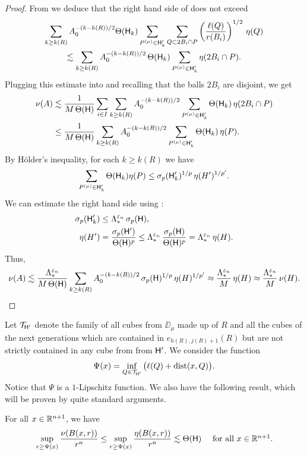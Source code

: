 \begin{proof}
From  we deduce that the right hand side of 
does not exceed
\begin{multline*}
\sum_{k\geq k(R)}A_0^{-(k-k(R))/2} \Theta({\mathsf{H}}_k)\sum_{P^{(\mu)}\in {\mathsf{H}}'_k} 
\sum_{Q\subset 2B_i\cap P} \left(\frac{\ell(Q)}{r(B_i)}\right)^{1/2}\,\eta(Q)\\
\lesssim \sum_{k\geq k(R)}A_0^{-(k-k(R))/2} \,\Theta({\mathsf{H}}_k)\sum_{P^{(\mu)}\in {\mathsf{H}}'_k} 
\eta(2B_i\cap P).
\end{multline*}
Plugging this estimate into  and recalling that the balls $2B_i$ are disjoint, we get
\begin{align*}
\nu(A) & \lesssim \frac{1}{M\,\Theta({\mathsf{H}})} \sum_{i\in I}
\sum_{k\geq k(R)}A_0^{-(k-k(R))/2} \sum_{P^{(\mu)}\in {\mathsf{H}}'_k} \Theta({\mathsf{H}}_k)\, \eta(2B_i\cap P)\\
& \leq
\frac{1}{M\,\Theta({\mathsf{H}})}
\sum_{k\geq k(R)}A_0^{-(k-k(R))/2} \sum_{P^{(\mu)}\in {\mathsf{H}}'_k} \Theta({\mathsf{H}}_k) \,\eta(P).
\end{align*}
By H\"older's inequality, for each $k\geq k(R)$ we have
$$\sum_{P^{(\mu)}\in {\mathsf{H}}'_k} \Theta({\mathsf{H}}_k) \eta(P) \leq \sigma_p({\mathsf{H}}'_k)^{1/p}\,\eta(H')^{1/p'}.
$$
We can estimate the right hand side using :
\begin{align*}
\sigma_p({\mathsf{H}}'_k)&\le \Lambda_*^{{\varepsilon}_n}\,\sigma_p({\mathsf{H}}),\\ \eta(H')&=\frac{\sigma_p({\mathsf{H}}')}{\Theta({\mathsf{H}})^p} \le \Lambda_*^{{\varepsilon}_n}\,\frac{\sigma_p({\mathsf{H}})}{\Theta({\mathsf{H}})^p} = \Lambda_*^{{\varepsilon}_n}\,\eta(H).
\end{align*}
Thus,
$$\nu(A) \lesssim \frac{\Lambda_*^{{\varepsilon}_n}}{M\,\Theta({\mathsf{H}})} \sum_{k\geq k(R)}A_0^{-(k-k(R))/2} \,\sigma_p({\mathsf{H}})^{1/p}\,\eta(H)^{1/p'}
\approx
\frac{\Lambda_*^{{\varepsilon}_n}}{M}\,\eta(H)\approx \frac{\Lambda_*^{{\varepsilon}_n}}{M}\,\nu(H).$$
\end{proof}
\vv


Let ${\mathcal T}_{{\mathsf{H}}'}$ denote the family of all cubes from $\DD_\mu$ 
 made up of $R$ and all the cubes of the next generations which are contained in $e_{h(R),j(R)+1}(R)$ but are not 
strictly contained in any cube from from ${\mathsf{H}}'$. We consider the function
\begin{equation}\label{eqdefPsi1}
\Psi(x) = \inf_{Q\in {\mathcal T}_{{\mathsf{H}}'}} \big(\ell(Q) +{\rm dist}(x,Q)\big).
\end{equation}
Notice that $\Psi$ is a $1$-Lipschitz function. We also have the following result, which will be proven
by quite standard arguments.

\begin{lemma}\label{lem6.77}
For all $x\in{\mathbb R}^{n+1}$, we have
\begin{equation}\label{ecreixnupsi}
\sup_{r\geq \Psi(x)} \frac{\nu(B(x,r))}{r^n} \leq \sup_{r\geq \Psi(x)} \frac{\eta(B(x,r))}{r^n} \lesssim \Theta({\mathsf{H}})\quad\mbox{ for all $x\in {\mathbb R}^{n+1}$.}
\end{equation}
\end{lemma}

